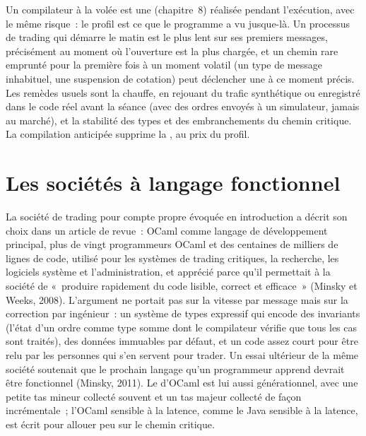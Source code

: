 Un compilateur à la volée est une  (chapitre~8) réalisée pendant l'exécution, avec le même risque~: le
profil est ce que le programme a vu jusque-là. Un processus de trading qui démarre le matin est le plus lent sur ses premiers
messages, précisément au moment où l'ouverture est la plus chargée, et un chemin rare emprunté pour la première fois à un moment
volatil (un type de message inhabituel, une suspension de cotation) peut déclencher une  à ce moment précis. Les remèdes usuels sont la chauffe, en rejouant du trafic synthétique ou
enregistré dans le code réel avant la séance (avec des ordres envoyés à un simulateur, jamais au marché), et la stabilité
des types et des embranchements du chemin critique. La compilation anticipée supprime la , au prix du profil.

\section{Les sociétés à langage fonctionnel}

La société de trading pour compte propre évoquée en introduction a décrit son choix dans un article de revue~: OCaml comme langage de développement principal,
plus de vingt programmeurs OCaml et des centaines de milliers de lignes de code, utilisé pour les systèmes de trading critiques, la recherche,
les logiciels système et l'administration, et apprécié parce qu'il permettait à la société de «~produire rapidement du code lisible, correct et efficace~»
(Minsky et Weeks, 2008). L'argument ne portait pas sur la vitesse par message mais sur la correction par ingénieur~: un système de types expressif
qui encode des invariants (l'état d'un ordre comme type somme dont le compilateur vérifie que tous les cas sont traités), des données immuables par
défaut, et un code assez court pour être relu par les personnes qui s'en servent pour trader. Un essai ultérieur de la même société soutenait que le
prochain langage qu'un programmeur apprend devrait être fonctionnel (Minsky, 2011). Le  d'OCaml est lui aussi générationnel, avec une petite
tas mineur collecté souvent et un tas majeur collecté de façon incrémentale~; l'OCaml sensible à la latence, comme le
Java sensible à la latence, est écrit pour allouer peu sur le chemin critique.


